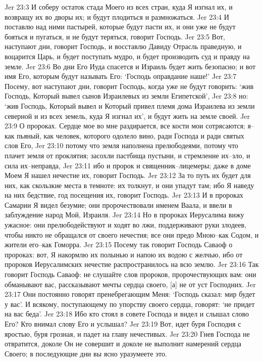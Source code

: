 Jer 23:3  И соберу остаток стада Моего из всех стран, куда Я изгнал их, и возвращу их во дворы их; и будут плодиться и размножаться.
Jer 23:4  И поставлю над ними пастырей, которые будут пасти их, и они уже не будут бояться и пугаться, и не будут теряться, говорит Господь.
Jer 23:5  Вот, наступают дни, говорит Господь, и восставлю Давиду Отрасль праведную, и воцарится Царь, и будет поступать мудро, и будет производить суд и правду на земле.
Jer 23:6  Во дни Его Иуда спасется и Израиль будет жить безопасно; и вот имя Его, которым будут называть Его: `Господь оправдание наше!'
Jer 23:7  Посему, вот наступают дни, говорит Господь, когда уже не будут говорить: `жив Господь, Который вывел сынов Израилевых из земли Египетской',
Jer 23:8  но: `жив Господь, Который вывел и Который привел племя дома Израилева из земли северной и из всех земель, куда Я изгнал их', и будут жить на земле своей.
Jer 23:9  О пророках. Сердце мое во мне раздирается, все кости мои сотрясаются; я--как пьяный, как человек, которого одолело вино, ради Господа и ради святых слов Его,
Jer 23:10  потому что земля наполнена прелюбодеями, потому что плачет земля от проклятия; засохли пастбища пустыни, и стремление их--зло, и сила их--неправда,
Jer 23:11  ибо и пророк и священник--лицемеры; даже в доме Моем Я нашел нечестие их, говорит Господь.
Jer 23:12  За то путь их будет для них, как скользкие места в темноте: их толкнут, и они упадут там; ибо Я наведу на них бедствие, год посещения их, говорит Господь.
Jer 23:13  И в пророках Самарии Я видел безумие; они пророчествовали именем Ваала, и ввели в заблуждение народ Мой, Израиля.
Jer 23:14  Но в пророках Иерусалима вижу ужасное: они прелюбодействуют и ходят во лжи, поддерживают руки злодеев, чтобы никто не обращался от своего нечестия; все они предо Мною--как Содом, и жители его--как Гоморра.
Jer 23:15  Посему так говорит Господь Саваоф о пророках: вот, Я накормлю их полынью и напою их водою с желчью, ибо от пророков Иерусалимских нечестие распространилось на всю землю.
Jer 23:16  Так говорит Господь Саваоф: не слушайте слов пророков, пророчествующих вам: они обманывают вас, рассказывают мечты сердца своего, [а] не от уст Господних.
Jer 23:17  Они постоянно говорят пренебрегающим Меня: `Господь сказал: мир будет у вас'. И всякому, поступающему по упорству своего сердца, говорят: `не придет на вас беда'.
Jer 23:18  Ибо кто стоял в совете Господа и видел и слышал слово Его? Кто внимал слову Его и услышал?
Jer 23:19  Вот, идет буря Господня с яростью, буря грозная, и падет на главу нечестивых.
Jer 23:20  Гнев Господа не отвратится, доколе Он не совершит и доколе не выполнит намерений сердца Своего; в последующие дни вы ясно уразумеете это.
